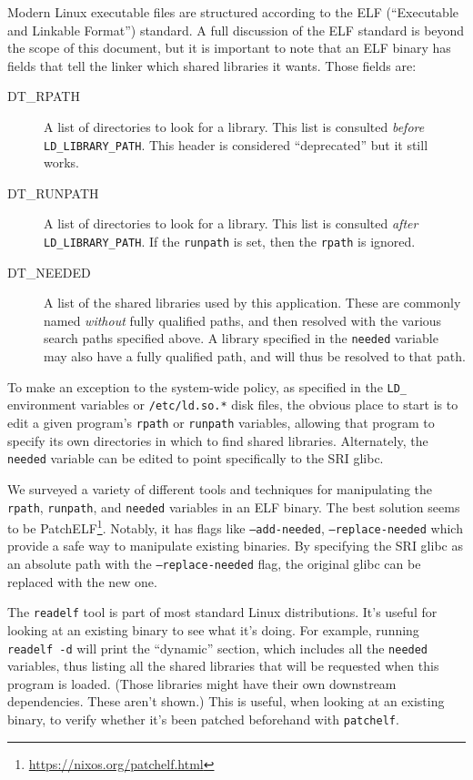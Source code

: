 Modern Linux executable files are structured according to the ELF
(``Executable and Linkable Format'') standard. A full discussion of
the ELF standard is beyond the scope of this document, but it is
important to note that an ELF binary has fields that tell the linker
which shared libraries it wants. Those fields are:

\begin{description}

\item[DT\_RPATH]
A list of directories to look for a library. This list is consulted
{\em before} \texttt{LD\_LIBRARY\_PATH}. This header is considered
``deprecated'' but it still works.
\item[DT\_RUNPATH]
A list of directories to look for a library. This list is consulted
{\em after} \texttt{LD\_LIBRARY\_PATH}. If the \texttt{runpath} is set, then
the \texttt{rpath} is ignored.

\item[DT\_NEEDED]
A list of the shared libraries used by this application. These are
commonly named {\em without} fully qualified paths, and then resolved
with the various search paths specified above. A library specified in
the \texttt{needed} variable may also have a fully qualified path, and
will thus be resolved to that path.

\end{description}

To make an exception to the system-wide policy, as specified in the
\texttt{LD\_} environment variables or \texttt{/etc/ld.so.*} disk files, the
obvious place to start is to edit a given program's \texttt{rpath} or
\texttt{runpath} variables, allowing that program to specify its own
directories in which to find shared libraries. Alternately, the \texttt{needed}
variable can be edited to point specifically to the SRI glibc.

We surveyed a variety of different tools and techniques for
manipulating the \texttt{rpath}, \texttt{runpath}, and \texttt{needed}
variables in an ELF binary. The best solution seems to be
PatchELF\footnote{\url{https://nixos.org/patchelf.html}}. Notably, it
has flags like \texttt{--add-needed}, \texttt{--replace-needed} which
provide a safe way to manipulate existing binaries. By specifying the
SRI glibc as an absolute path with the \texttt{--replace-needed}
flag, the original glibc can be replaced with the new one.

The \texttt{readelf} tool is part of most standard Linux
distributions. It's useful for looking at an existing binary to see
what it's doing. For example, running \texttt{readelf -d} will print the
``dynamic'' section, which includes all the \texttt{needed} variables,
thus listing all the shared libraries that will be requested when this
program is loaded. (Those libraries might have their own downstream
dependencies. These aren't shown.) This is useful, when looking at an
existing binary, to verify whether it's been patched beforehand with
\texttt{patchelf}.

